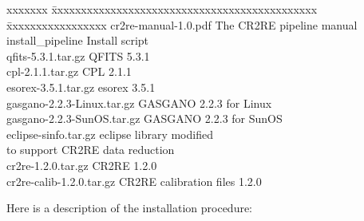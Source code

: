 \begin{tabbing}
xxxxxxx \=  xxxxxxxxxxxxxxxxxxxxxxxxxxxxxxxxxxxxxxxxxxxxx \= xxxxxxxxxxxxxxxxx \kill
\> cr2re-manual-1.0.pdf     \> The CR2RE pipeline manual      \\
\> install\_pipeline          \> Install script                 \\
\> qfits-5.3.1.tar.gz         \> QFITS 5.3.1                    \\
\> cpl-2.1.1.tar.gz           \> CPL 2.1.1                      \\
\> esorex-3.5.1.tar.gz        \> esorex 3.5.1                   \\
\> gasgano-2.2.3-Linux.tar.gz \> GASGANO 2.2.3 for Linux        \\
\> gasgano-2.2.3-SunOS.tar.gz \> GASGANO 2.2.3 for SunOS        \\
\> eclipse-sinfo.tar.gz       \> eclipse library modified       \\
\>                            \> to support CR2RE data reduction \\
\> cr2re-1.2.0.tar.gz         \> CR2RE 1.2.0                    \\
\> cr2re-calib-1.2.0.tar.gz   \> CR2RE calibration files 1.2.0  \\
\end{tabbing}

Here is a description of the installation procedure:

